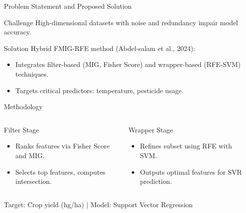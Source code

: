 \documentclass{beamer}
\begin{document}
\begin{frame}{Problem Statement and Proposed Solution}
    \begin{block}{Challenge}
        High-dimensional datasets with noise and redundancy impair model accuracy.
    \end{block}
    \pause
    \begin{block}{Solution}
        Hybrid FMIG-RFE method (Abdel-salam et al., 2024):
        \begin{itemize}
            \item Integrates filter-based (MIG, Fisher Score) and wrapper-based (RFE-SVM) techniques.
            \item Targets critical predictors: temperature, pesticide usage.
        \end{itemize}
    \end{block}
\end{frame}

\begin{frame}{Methodology}
    \begin{columns}[T]
        \begin{block}{Filter Stage}
            \begin{itemize}
                \item Ranks features via Fisher Score and MIG.
                \item Selects top features, computes intersection.
            \end{itemize}
        \end{block}
        \begin{block}{Wrapper Stage}
            \begin{itemize}
                \item Refines subset using RFE with SVM.
                \item Outputs optimal features for SVR prediction.
            \end{itemize}
        \end{block}
    \end{columns}
    \begin{center}
        \small{Target: Crop yield (hg/ha) | Model: Support Vector Regression}
    \end{center}
\end{frame}
\end{document}
